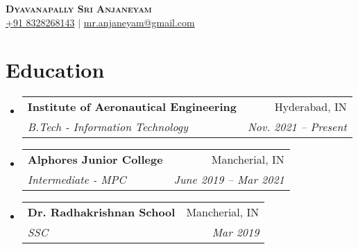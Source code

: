 \documentclass[letterpaper,11pt]{article}
\makeatletter
\newcommand{\resumeItem}[1]{
  \item\small{
    {#1 \vspace{-2pt}}
  }
}
\newcommand{\resumeSubheading}[4]{
  \vspace{-2pt}\item
    \begin{tabular*}{0.97\textwidth}[t]{l@{\extracolsep{\fill}}r}
      \textbf{#1} & #2 \\
      \textit{\small#3} & \textit{\small #4} \\
    \end{tabular*}\vspace{-7pt}
}
\newcommand{\resumeSubSubheading}[2]{
    \item
    \begin{tabular*}{0.97\textwidth}{l@{\extracolsep{\fill}}r}
      \textit{\small#1} & \textit{\small #2} \\
    \end{tabular*}\vspace{-7pt}
}
\newcommand{\resumeSubHeadingListStart}{\begin{itemize}[leftmargin=0.15in, label={}]}
\newcommand{\resumeSubHeadingListEnd}{\end{itemize}}
\newcommand{\resumeItemListStart}{\begin{itemize}}
\newcommand{\resumeItemListEnd}{\end{itemize}\vspace{-5pt}}
\makeatother
\begin{document}

\begin{center}
    \textbf{\Huge \scshape Dyavanapally Sri Anjaneyam} \\ \vspace{1pt}
    \href{tel:+918328268143}{\small +91 8328268143} $|$ \href{mailto:mr.anjaneyam@gmail.com}{mr.anjaneyam@gmail.com}

\end{center}


\section{Education}
  \resumeSubHeadingListStart
    \resumeSubheading
      {Institute of Aeronautical Engineering}{Hyderabad, IN}
      {B.Tech - Information Technology}{Nov. 2021 -- Present}
    \resumeSubheading
      {Alphores Junior College}{Mancherial, IN}
      {Intermediate - MPC}{June 2019 -- Mar 2021}
    \resumeSubheading
      {Dr. Radhakrishnan School}{Mancherial, IN}
      {SSC}{Mar 2019}
  \resumeSubHeadingListEnd



      
\end{document}
